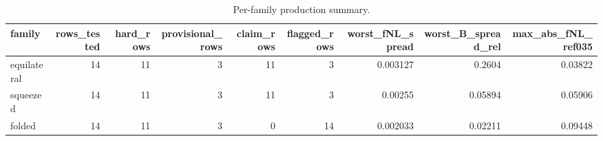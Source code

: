 \begin{table}[htbp]
\centering
\caption{Per-family production summary.}
\label{tab:families}
\begin{tabular}{lrrrrrrrr}
\hline
family & rows\_tested & hard\_rows & provisional\_rows & claim\_rows & flagged\_rows & worst\_fNL\_spread & worst\_B\_spread\_rel & max\_abs\_fNL\_ref035 \\
\hline
equilateral & 14 & 11 & 3 & 11 & 3 & 0.003127 & 0.2604 & 0.03822 \\
squeezed & 14 & 11 & 3 & 11 & 3 & 0.00255 & 0.05894 & 0.05906 \\
folded & 14 & 11 & 3 & 0 & 14 & 0.002033 & 0.02211 & 0.09448 \\
\hline
\end{tabular}
\end{table}
